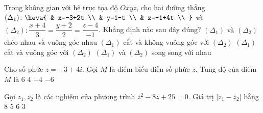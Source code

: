 \begin{ex}%
	Trong không gian với hệ trục tọa độ $Oxyz$, cho hai đường thẳng $(\Delta_1)\colon\heva{
		& x=-3+2t \\ 
		& y=1-t \\ 
		& z=-1+4t \\ }$ và $(\Delta_2)\colon \dfrac{x+4}{3}=\dfrac{y+2}{2}=\dfrac{z-4}{-1}$. Khẳng định nào sau đây đúng?
	\choice
	{$(\Delta_1)$ và $(\Delta_2)$ chéo nhau và vuông góc nhau}
	{$(\Delta_1)$ cắt và không vuông góc với $(\Delta_2)$}
	{\True $(\Delta_1)$ cắt và vuông góc với $(\Delta_2)$}
	{$(\Delta_1)$ và $(\Delta_2)$ song song với nhau}
\end{ex}
\begin{ex}%
	Cho số phức $ z=-3+4i $. Gọi $ M $ là điểm biểu diễn số phức $ \overline{z} $. Tung độ của điểm $ M $ là
	\choice
	{$6$}
	{$4$}
	{\True $-4$}
	{$-6$}
\end{ex}
\begin{ex}%
	Gọi $z_1, z_2$ là các nghiệm của phương trình $z^2-8z+25=0$. Giá trị $\left|{z_1-z_2}\right|$ bằng
	\choice
	{$8$}
	{$5$}
	{\True $6$}
	{$3$}
\end{ex}
